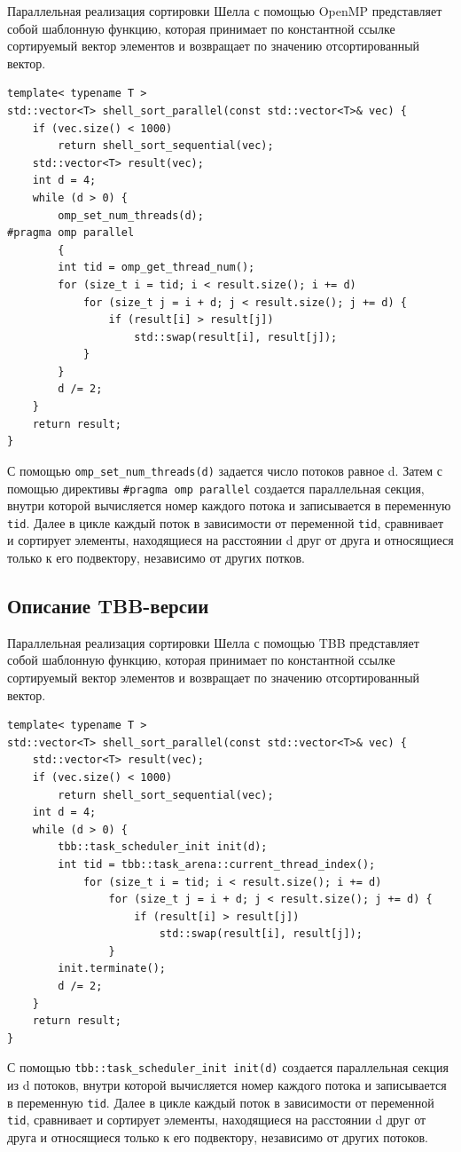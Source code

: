 \documentclass{report}
\begin{document}
Параллельная реализация сортировки Шелла с помощью OpenMP представляет собой шаблонную функцию, которая принимает по константной ссылке сортируемый вектор элементов и возвращает по значению отсортированный вектор.
\begin{lstlisting}
template< typename T >
std::vector<T> shell_sort_parallel(const std::vector<T>& vec) {
    if (vec.size() < 1000)
        return shell_sort_sequential(vec);
    std::vector<T> result(vec);
    int d = 4;
    while (d > 0) {
        omp_set_num_threads(d);
#pragma omp parallel
        {
        int tid = omp_get_thread_num();
        for (size_t i = tid; i < result.size(); i += d)
            for (size_t j = i + d; j < result.size(); j += d) {
                if (result[i] > result[j])
                    std::swap(result[i], result[j]);
            }
        }
        d /= 2;
    }
    return result;
}
\end{lstlisting}
С помощью \verb|omp_set_num_threads(d)| задается число потоков равное d. Затем с помощью директивы \verb|#pragma omp parallel| создается параллельная секция, внутри которой вычисляется номер каждого потока и записывается в переменную \verb|tid|. Далее в цикле каждый поток в зависимости от переменной \verb|tid|, сравнивает и сортирует элементы, находящиеся на расстоянии d друг от друга и относящиеся только к его подвектору, независимо от других потков.

\subsection*{Описание TBB-версии}
Параллельная реализация сортировки Шелла с помощью TBB представляет собой шаблонную функцию, которая принимает по константной ссылке сортируемый вектор элементов и возвращает по значению отсортированный вектор.
\begin{lstlisting}
template< typename T >
std::vector<T> shell_sort_parallel(const std::vector<T>& vec) {
    std::vector<T> result(vec);
    if (vec.size() < 1000)
        return shell_sort_sequential(vec);
    int d = 4;
    while (d > 0) {
        tbb::task_scheduler_init init(d);
        int tid = tbb::task_arena::current_thread_index();
            for (size_t i = tid; i < result.size(); i += d)
                for (size_t j = i + d; j < result.size(); j += d) {
                    if (result[i] > result[j])
                        std::swap(result[i], result[j]);
                }
        init.terminate();
        d /= 2;
    }
    return result;
}
\end{lstlisting}
С помощью \verb|tbb::task_scheduler_init init(d)| создается параллельная секция из d потоков, внутри которой вычисляется номер каждого потока и записывается в переменную \verb|tid|. Далее в цикле каждый поток в зависимости от переменной \verb|tid|, сравнивает и сортирует элементы, находящиеся на расстоянии d друг от друга и относящиеся только к его подвектору, независимо от других потоков.
\end{document}
